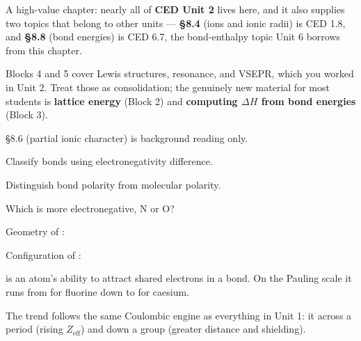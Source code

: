 \documentclass{apchem-notes}
\begin{document}
\apctitleblock

\begin{apcnote}
A high-value chapter: nearly all of \textbf{CED Unit 2} lives here, and it
also supplies two topics that belong to other units ---
\textbf{\S8.4} (ions and ionic radii) is CED 1.8, and
\textbf{\S8.8} (bond energies) is CED 6.7, the bond-enthalpy topic Unit 6
borrows from this chapter.

Blocks 4 and 5 cover Lewis structures, resonance, and VSEPR, which you
worked in Unit 2. Treat those as consolidation; the genuinely new material
for most students is \textbf{lattice energy} (Block 2) and
\textbf{computing $\Delta H$ from bond energies} (Block 3).

\S8.6 (partial ionic character) is background reading only.
\end{apcnote}


\begin{objectives}
  \item Classify bonds using electronegativity difference.
  \item Distinguish bond polarity from molecular polarity.
\end{objectives}


\begin{warmup}[3]
  \item Which is more electronegative, N or O?
  \item Geometry of : 
  \item Configuration of : \answerblank[2.6cm]{$[\ce{Ne}]$}
\end{warmup}



 is an atom's ability to attract shared electrons in
a bond. On the Pauling scale it runs from
 for fluorine down to  for
caesium.

The trend follows the same Coulombic engine as everything in Unit 1: it
 across a period (rising $Z_{\text{eff}}$) and
 down a group (greater distance and shielding).
\end{document}
